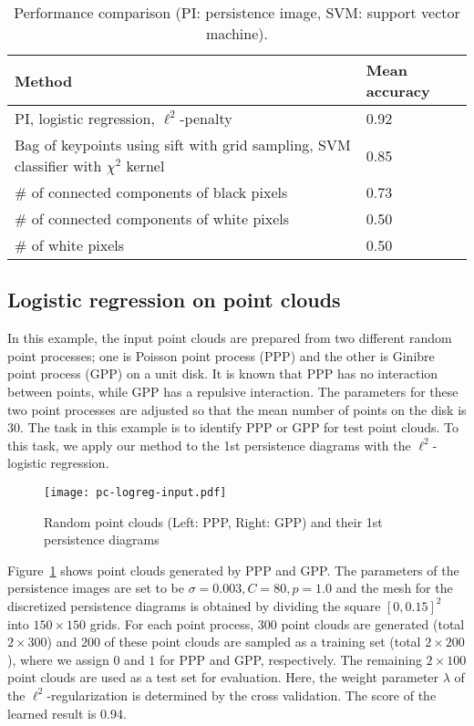 \documentclass[smallextended]{svjour3}
\begin{document}
\begin{table}[htbp]
  \centering
  \begin{tabular}{|p{8cm}|l|} \hline
    Method & Mean accuracy \\ \hline\hline
    PI, logistic regression, $\ell^2$-penalty & 0.92 \\ \hline
    Bag of keypoints using sift with grid sampling,
    SVM classifier with $\chi^2$ kernel & 0.85 \\ \hline
    \# of connected components of black pixels & 0.73 \\ \hline
    \# of connected components of white pixels & 0.50 \\ \hline
    \# of white pixels & 0.50 \\ \hline
  \end{tabular}
  \caption{Performance comparison (PI: persistence image, SVM: support vector machine). %
  }
  \label{tab:logreg_results}
\end{table}








\subsection{Logistic regression on point clouds}
In this example, the input point clouds are prepared from two different random
point processes; one is Poisson point process (PPP) and
the other is Ginibre point process (GPP) on a unit disk.
It is known that PPP has no interaction between points, while GPP has a repulsive interaction. The parameters for these two point processes are
adjusted so that the mean number of points on the disk is 30. 
The task in this example is to identify PPP or GPP for test point clouds. 
To this task, we apply our method  to the 1st persistence diagrams with  the $\ell^2$-logistic regression.

\begin{figure}[htbp]
  \centering
  \texttt{[image: pc-logreg-input.pdf]}
  \caption{Random point clouds (Left: PPP, Right: GPP) and their 1st persistence diagrams}
  \label{fig:input_PPP_GPP}
\end{figure}


Figure~\ref{fig:input_PPP_GPP} shows point clouds generated by  
PPP and GPP. The parameters of the persistence images are set to be 
$\sigma=0.003, C=80, p = 1.0$ and the mesh for the discretized persistence diagrams is obtained by dividing the square $[0, 0.15]^2$ into $150\times 150$ grids.  
For each point process, 300 point clouds are generated (total $2 \times 300$)
and 200 of these point clouds are sampled as a training set (total $2 \times 200$), where we assign $0$ and $1$ for PPP and GPP, respectively. The remaining $2 \times 100$ point clouds are used as a test set for evaluation. 
Here, the weight parameter $\lambda$ of the $\ell^2$-regularization is determined by the cross validation. The score of the learned result  is 0.94. 
\end{document}
